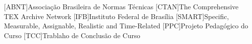 
\begin{acronym}[ACRONYM] 
[ABNT]{Associação Brasileira de Normas Técnicas}
[CTAN]{The Comprehensive TEX Archive Network}
[IFB]{Instituto Federal de Brasília}
[SMART]{Specific, Measurable, Assignable, Realistic and Time-Related}
[PPC]{Projeto Pedagógico do Curso}
[TCC]{Trablaho de Conclusão de Curso}

\end{acronym}

